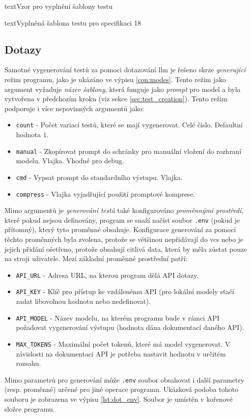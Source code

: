 \documentclass[czech, ma, kiv, he, iso690numb, pdf, viewonly]{fasthesis}
\begin{document}
\begin{code}{text}{Vzor pro vyplnění šablony testu \label{lst:template}}
{\begin{code}{text}{Vyplněná šablona testu pro specifikaci 18 \label{lst:spec18}}
{        \subsection{Dotazy} \label{sec:llm_requests}
        Samotné vygenerování testů za pomoci dotazování \Gls{llm} je řešeno skrze \textit{generující} režim programu, jako je ukázáno ve výpisu \ref{con:modes}. Tento režim jako argument vyžaduje \textit{název šablony}, která funguje jako \textit{prompt} pro model a byla vytvořena v předchozím kroku (viz sekce \ref{sec:test_creation}). Tento režim podporuje i více nepovinných argumentů jako:
        \begin{itemize}
            \item \verb|count| - Počet variací testů, které se mají vygenerovat. Celé číslo. Defaultní hodnota \(1\).
            \item \verb|manual| - Zkopírovat prompt do schránky pro manuální vložení do rozhraní modelu. Vlajka. Vhodné pro debug.
            \item \verb|cmd| - Vypsat prompt do standardního výstupu. Vlajka.
            \item \verb|compress| - Vlajka vyjadřující použití promptové komprese.
        \end{itemize}

        Mimo argumentů je \textit{generování testů} také konfigurováno \textit{proměnnými prostředí}, které pokud nejsou definovány, program se snaží načíst soubor \verb|.env| (pokud je přítomný), který tyto proměnné obsahuje. Konfigurace generování za pomocí těchto proměnných byla zvolena, protože se většinou nepřidávají do \Acrshort{vcs} nebo je jejich přidání ošetřeno, protože obsahují citlivá data, která by měla zůstat pouze na stroji uživatele. Mezi základní proměnné prostřední patří:
        \begin{itemize}
            \item \verb|API_URL| - Adresa URL, na kterou program dělá API dotazy.
            \item \verb|API_KEY| - Klíč pro přístup ke vzdálenému API (pro lokální modely stačí zadat libovolnou hodnotu nebo nedefinovat).
            \item \verb|API_MODEL| - Název modelu, na kterém programu bude v rámci API požadovat vygenerování výstupu (hodnota dána dokumentací daného API).
            \item \verb|MAX_TOKENS| - Maximální počet tokenů, které má model vygenerovat. V závislosti na dokumentaci API je potřeba nastavit hodnotu v určitém rozsahu.
        \end{itemize}
        Mimo parametrů pro generování může \verb|.env| soubor obsahovat i další parametry (resp. proměnné) určené pro jiné operace programu. Ukázková podoba tohoto souboru je zobrazena ve výpisu \ref{lst:dot_env}. Soubor je umístěn v kořenové složce programu.

}
\end{code}}
\end{code}
\end{document}
